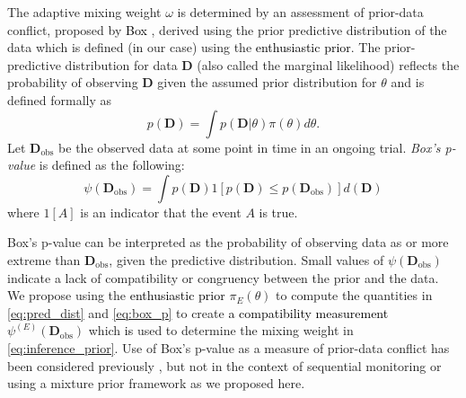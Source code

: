 \documentclass[12pt]{article}
\begin{document}
The adaptive mixing weight $\omega$ is determined by an assessment of prior-data conflict, proposed by \textcolor{black}{Box} \citep{Box1980}, derived using the prior predictive distribution of 
the data which is defined (in our case) using the \textcolor{black}{enthusiastic prior}.
The prior-predictive distribution for data $\mathbf{D}$ (also called the marginal likelihood) reflects the probability of observing $\mathbf{D}$ given 
the assumed prior distribution for $\theta$ and is defined formally as
\begin{equation}\label{eq:pred_dist}
p(\mathbf{D}) =\int p(\mathbf{D}|\theta)\pi(\theta)d\theta.
\end{equation}
Let $\mathbf{D}_{\text{obs}}$ be the observed data at some point in time in an ongoing trial. 
\textit{Box's p-value} is defined as the following:
\begin{equation}\label{eq:box_p}
\psi({\mathbf{D}_{\text{obs}}})=\int {p(\mathbf{D})}  1[p(\mathbf{D})\leq p(\mathbf{D}_{\text{obs}})] d(\mathbf{D})
\end{equation}
%
where $1[A]$ is an indicator that the event $A$ is true.

Box's p-value can be interpreted as the probability of observing data as or more extreme than $\mathbf{D}_{\text{obs}}$, given the predictive distribution. 
%
Small values of $\psi({\mathbf{D}_{\text{obs}}})$ indicate a lack of compatibility or congruency between the prior and the data. 
%
We propose using the \textcolor{black}{enthusiastic prior} $\pi_E(\theta)$ to compute the quantities in \eqref{eq:pred_dist} and \eqref{eq:box_p} to create \textcolor{black}{a compatibility measurement} $\psi^{(E)}(\mathbf{D}_{\text{obs}})$ which \textcolor{black}{is} used to determine the mixing weight in \eqref{eq:inference_prior}. Use of Box's p-value as a measure of prior-data conflict has been considered previously \citep{PsiodaXue2020}, but not in the context of sequential monitoring or using a mixture prior framework as we proposed here.
\end{document}
